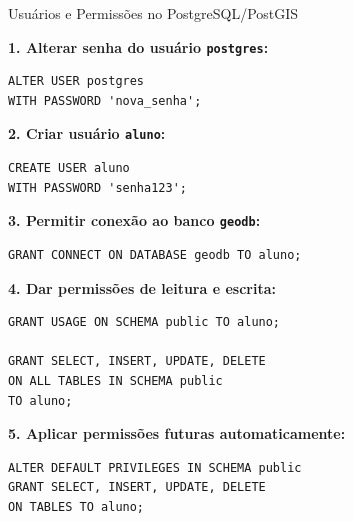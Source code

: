 \documentclass{beamer}
\begin{document}
\begin{frame}[fragile]{Usuários e Permissões no PostgreSQL/PostGIS}

\textbf{1. Alterar senha do usuário \texttt{postgres}:}

\begin{verbatim}
ALTER USER postgres
WITH PASSWORD 'nova_senha';
\end{verbatim}

\vspace{0.3cm}

\textbf{2. Criar usuário \texttt{aluno}:}

\begin{verbatim}
CREATE USER aluno
WITH PASSWORD 'senha123';
\end{verbatim}

\vspace{0.3cm}

\textbf{3. Permitir conexão ao banco \texttt{geodb}:}

\begin{verbatim}
GRANT CONNECT ON DATABASE geodb TO aluno;
\end{verbatim}

\vspace{0.3cm}

\textbf{4. Dar permissões de leitura e escrita:}

\begin{verbatim}
GRANT USAGE ON SCHEMA public TO aluno;

GRANT SELECT, INSERT, UPDATE, DELETE
ON ALL TABLES IN SCHEMA public
TO aluno;
\end{verbatim}

\vspace{0.3cm}

\textbf{5. Aplicar permissões futuras automaticamente:}

\begin{verbatim}
ALTER DEFAULT PRIVILEGES IN SCHEMA public
GRANT SELECT, INSERT, UPDATE, DELETE
ON TABLES TO aluno;
\end{verbatim}

\end{frame}
\end{document}
